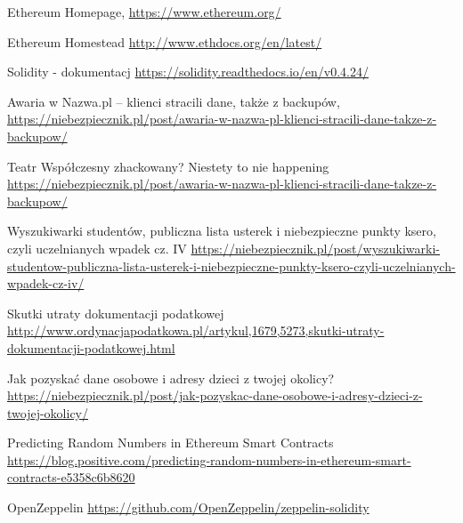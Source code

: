 \documentclass[]{llncs}
\begin{document}
%
%
%
% 
% 
%
\begin{thebibliography}{splncs04}
   Ethereum Homepage,
  \url{https://www.ethereum.org/}

   Ethereum Homestead
  \url{http://www.ethdocs.org/en/latest/}

   Solidity - dokumentacj
  \url{https://solidity.readthedocs.io/en/v0.4.24/}

   Awaria w Nazwa.pl – klienci stracili dane, także z backupów,
  \url{https://niebezpiecznik.pl/post/awaria-w-nazwa-pl-klienci-stracili-dane-takze-z-backupow/}

   Teatr Współczesny zhackowany? Niestety to nie happening
  \url{https://niebezpiecznik.pl/post/awaria-w-nazwa-pl-klienci-stracili-dane-takze-z-backupow/}

   Wyszukiwarki studentów, publiczna lista usterek i niebezpieczne punkty ksero, czyli uczelnianych wpadek cz. IV
  \url{https://niebezpiecznik.pl/post/wyszukiwarki-studentow-publiczna-lista-usterek-i-niebezpieczne-punkty-ksero-czyli-uczelnianych-wpadek-cz-iv/}

   Skutki utraty dokumentacji podatkowej
  \url{http://www.ordynacjapodatkowa.pl/artykul,1679,5273,skutki-utraty-dokumentacji-podatkowej.html}

   Jak pozyskać dane osobowe i adresy dzieci z twojej okolicy?
  \url{https://niebezpiecznik.pl/post/jak-pozyskac-dane-osobowe-i-adresy-dzieci-z-twojej-okolicy/}

   Predicting Random Numbers in Ethereum Smart Contracts
  \url{https://blog.positive.com/predicting-random-numbers-in-ethereum-smart-contracts-e5358c6b8620}

   OpenZeppelin
  \url{https://github.com/OpenZeppelin/zeppelin-solidity}

\end{thebibliography}




\end{document}
